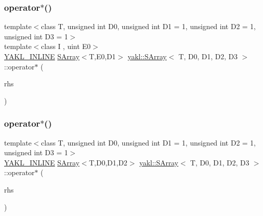 \mbox{\label{classyakl_1_1SArray_ac95650b78dde3d4dc8acacf8e7ded37f}} 
\subsubsection{\texorpdfstring{operator$\ast$()}{operator*()}\hspace{0.1cm}{\footnotesize\ttfamily [2/3]}}
{\footnotesize\ttfamily template$<$class T, unsigned int D0, unsigned int D1 = 1, unsigned int D2 = 1, unsigned int D3 = 1$>$ \\
template$<$class I , uint E0$>$ \\
\hyperlink{YAKL_8h_aa0dd629ffce6d564b19e9313fb91a5ad}{Y\+A\+K\+L\+\_\+\+I\+N\+L\+I\+NE} \hyperlink{classyakl_1_1SArray}{S\+Array}$<$T,E0,D1$>$ \hyperlink{classyakl_1_1SArray}{yakl\+::\+S\+Array}$<$ T, D0, D1, D2, D3 $>$\+::operator$\ast$ (\begin{DoxyParamCaption}\item[{\hyperlink{classyakl_1_1SArray}{S\+Array}$<$ I, E0, D0 $>$ const \&}]{rhs }\end{DoxyParamCaption})\hspace{0.3cm}{\ttfamily [inline]}}

\mbox{\label{classyakl_1_1SArray_a9001441d80759e0e532ade1e7481ec96}} 
\subsubsection{\texorpdfstring{operator$\ast$()}{operator*()}\hspace{0.1cm}{\footnotesize\ttfamily [3/3]}}
{\footnotesize\ttfamily template$<$class T, unsigned int D0, unsigned int D1 = 1, unsigned int D2 = 1, unsigned int D3 = 1$>$ \\
\hyperlink{YAKL_8h_aa0dd629ffce6d564b19e9313fb91a5ad}{Y\+A\+K\+L\+\_\+\+I\+N\+L\+I\+NE} \hyperlink{classyakl_1_1SArray}{S\+Array}$<$T,D0,D1,D2$>$ \hyperlink{classyakl_1_1SArray}{yakl\+::\+S\+Array}$<$ T, D0, D1, D2, D3 $>$\+::operator$\ast$ (\begin{DoxyParamCaption}\item[{T}]{rhs }\end{DoxyParamCaption})\hspace{0.3cm}{\ttfamily [inline]}}

